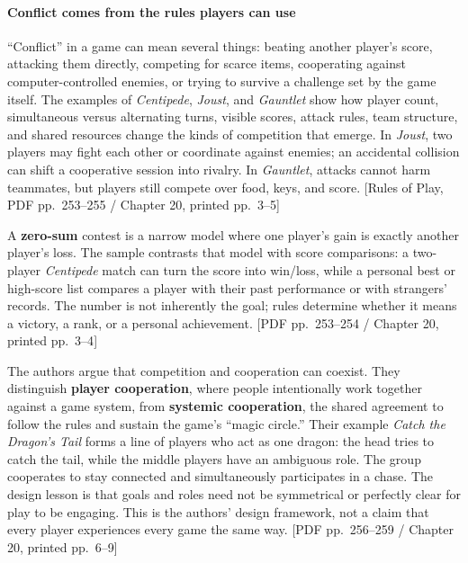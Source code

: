 \paragraph{Conflict comes from the rules players can use}\label{05-engine-i-ch009-conflict-comes-from-the-rules-players-can-use}

\hypertarget{05-engine-i-ch009-conflict-comes-from-the-rules-players-can-use}{}

``Conflict'' in a game can mean several things: beating another player's score, attacking them directly, competing for scarce items, cooperating against computer-controlled enemies, or trying to survive a challenge set by the game itself. The examples of \emph{Centipede}, \emph{Joust}, and \emph{Gauntlet} show how player count, simultaneous versus alternating turns, visible scores, attack rules, team structure, and shared resources change the kinds of competition that emerge. In \emph{Joust}, two players may fight each other or coordinate against enemies; an accidental collision can shift a cooperative session into rivalry. In \emph{Gauntlet}, attacks cannot harm teammates, but players still compete over food, keys, and score. {[}Rules of Play, PDF pp.~253--255 / Chapter 20, printed pp.~3--5{]}

A \textbf{zero-sum} contest is a narrow model where one player's gain is exactly another player's loss. The sample contrasts that model with score comparisons: a two-player \emph{Centipede} match can turn the score into win/loss, while a personal best or high-score list compares a player with their past performance or with strangers' records. The number is not inherently the goal; rules determine whether it means a victory, a rank, or a personal achievement. {[}PDF pp.~253--254 / Chapter 20, printed pp.~3--4{]}

The authors argue that competition and cooperation can coexist. They distinguish \textbf{player cooperation}, where people intentionally work together against a game system, from \textbf{systemic cooperation}, the shared agreement to follow the rules and sustain the game's ``magic circle.'' Their example \emph{Catch the Dragon's Tail} forms a line of players who act as one dragon: the head tries to catch the tail, while the middle players have an ambiguous role. The group cooperates to stay connected and simultaneously participates in a chase. The design lesson is that goals and roles need not be symmetrical or perfectly clear for play to be engaging. This is the authors' design framework, not a claim that every player experiences every game the same way. {[}PDF pp.~256--259 / Chapter 20, printed pp.~6--9{]}

